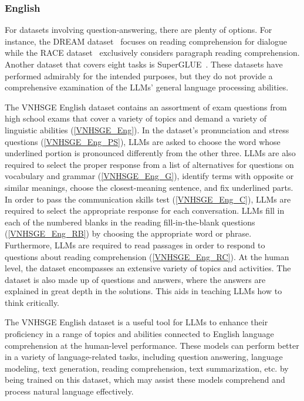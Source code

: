\documentclass{article}
\begin{document}
{	
	\subsubsection{English}
	
	
	For datasets involving question-answering, there are plenty of options. For instance, the DREAM dataset~\cite{sun2019dream} focuses on reading comprehension for dialogue while the RACE dataset~\cite{Lai2017} exclusively considers paragraph reading comprehension. Another dataset that covers eight tasks is SuperGLUE~\cite{wang2019superglue}. These datasets have performed admirably for the intended purposes, but they do not provide a comprehensive examination of the LLMs' general language processing abilities.
	
	The VNHSGE English dataset contains an assortment of exam questions from high school exams that cover a variety of topics and demand a variety of linguistic abilities (\ref{VNHSGE_Eng}). In the dataset's pronunciation and stress questions (\ref{VNHSGE_Eng_PS}), LLMs are asked to choose the word whose underlined portion is pronounced differently from the other three. LLMs are also required to select the proper response from a list of alternatives for questions on vocabulary and grammar (\ref{VNHSGE_Eng_G}), identify terms with opposite or similar meanings, choose the closest-meaning sentence, and fix underlined parts. In order to pass the communication skills test (\ref{VNHSGE_Eng_C}), LLMs are required to select the appropriate response for each conversation. LLMs fill in each of the numbered blanks in the reading fill-in-the-blank questions (\ref{VNHSGE_Eng_RB}) by choosing the appropriate word or phrase. Furthermore, LLMs are required to read passages in order to respond to questions about reading comprehension (\ref{VNHSGE_Eng_RC}). At the human level, the dataset encompasses an extensive variety of topics and activities. The dataset is also made up of questions and answers, where the answers are explained in great depth in the solutions. This aids in teaching LLMs how to think critically.
	
	The VNHSGE English dataset is a useful tool for LLMs to enhance their proficiency in a range of topics and abilities connected to English language comprehension at the human-level performance. These models can perform better in a variety of language-related tasks, including question answering, language modeling, text generation, reading comprehension, text summarization, etc. by being trained on this dataset, which may assist these models comprehend and process natural language effectively.
	
}
\end{document}
